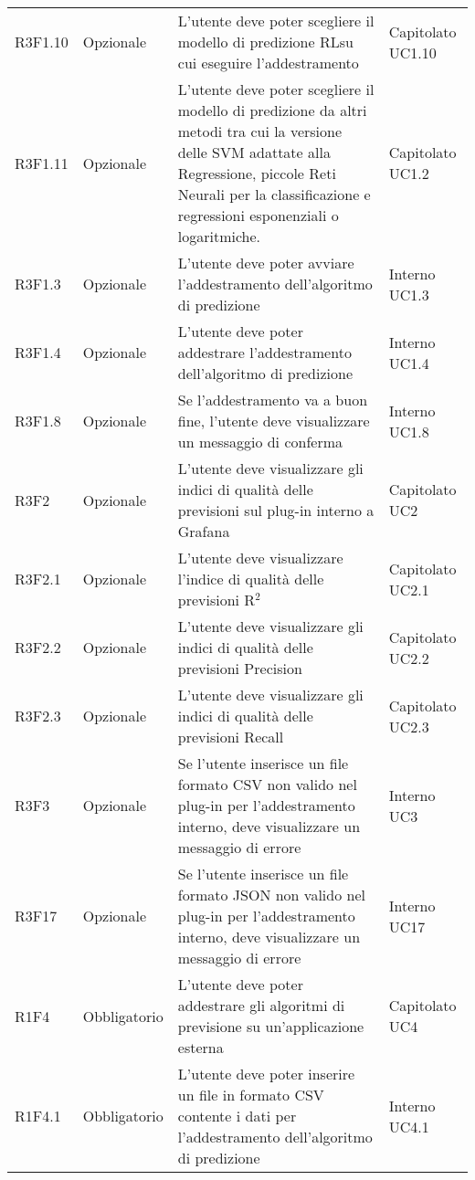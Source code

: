 \begin{longtable} {
		>{}p{24mm} 
		>{}p{32mm}
		>{}p{40mm} 
		>{}p{24.5mm}
		}
		R3F1.10 & Opzionale & L'utente deve poter scegliere il modello di predizione RL\glosp su cui eseguire l'addestramento & Capitolato UC1.10 \TBstrut \\ [2mm]
		R3F1.11 & Opzionale & L'utente deve poter scegliere il modello di predizione da altri metodi tra cui la versione delle SVM adattate alla Regressione, piccole Reti Neurali per la classificazione e regressioni esponenziali o logaritmiche. & Capitolato UC1.2 \TBstrut \\
		R3F1.3 & Opzionale & L'utente deve poter avviare l'addestramento dell'algoritmo di predizione & Interno UC1.3 \TBstrut \\ [2mm]
		R3F1.4 & Opzionale & L'utente deve poter addestrare l'addestramento dell'algoritmo di predizione & Interno UC1.4 \TBstrut \\ [2mm]
		R3F1.8 & Opzionale & Se l'addestramento va a buon fine, l'utente deve visualizzare un messaggio di conferma & Interno UC1.8 \TBstrut \\ [2mm]		
		R3F2 & Opzionale & L'utente deve visualizzare gli indici di qualità delle previsioni sul plug-in interno a Grafana\glosp & Capitolato UC2 \TBstrut \\ [2mm]
		R3F2.1 & Opzionale & L'utente deve visualizzare l'indice di qualità delle previsioni R$^{2}$\glo & Capitolato UC2.1 \TBstrut \\ [2mm]
		R3F2.2 & Opzionale & L'utente deve visualizzare gli indici di qualità delle previsioni Precision & Capitolato UC2.2 \TBstrut \\ [2mm]
		R3F2.3 & Opzionale & L'utente deve visualizzare gli indici di qualità delle previsioni Recall & Capitolato UC2.3 \TBstrut \\ [2mm]
		R3F3 & Opzionale & Se l'utente inserisce un file formato CSV non valido nel plug-in per l'addestramento interno, deve visualizzare un messaggio di errore & Interno UC3 \TBstrut \\ [2mm]
		R3F17 & Opzionale & Se l'utente inserisce un file formato JSON non valido nel plug-in per l'addestramento interno, deve visualizzare un messaggio di errore & Interno UC17 \TBstrut \\ [2mm]	
		R1F4 & Obbligatorio & L'utente deve poter addestrare gli algoritmi di previsione su un'applicazione esterna & Capitolato UC4 \TBstrut \\ [2mm]		
		R1F4.1 & Obbligatorio & L'utente deve poter inserire un file in formato CSV contente i dati per l'addestramento dell'algoritmo di predizione & Interno UC4.1 \TBstrut \\ [2mm]		

\end{longtable}
